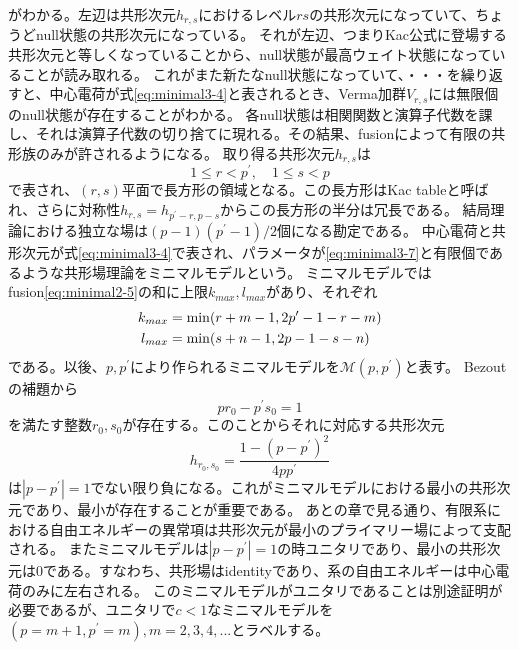 \documentclass[11pt, aps, longbibliography]{article}
\numberwithin{equation}{section}
\begin{document}
        がわかる。左辺は共形次元$h_{r,s}$におけるレベル$rs$の共形次元になっていて、ちょうどnull状態の共形次元になっている。
        それが左辺、つまりKac公式に登場する共形次元と等しくなっていることから、null状態が最高ウェイト状態になっていることが読み取れる。
        これがまた新たなnull状態になっていて、・・・を繰り返すと、中心電荷が式\eqref{eq:minimal3-4}と表されるとき、Verma加群$V_{r,s}$には無限個のnull状態が存在することがわかる。
        各null状態は相関関数と演算子代数を課し、それは演算子代数の切り捨てに現れる。その結果、fusionによって有限の共形族のみが許されるようになる。
        取り得る共形次元$h_{r,s}$は
        \begin{equation}\label{eq:minimal3-7}
            1 \leq r < p^\prime, \quad 1 \leq s < p
        \end{equation}
        で表され、$(r,s)$平面で長方形の領域となる。この長方形はKac tableと呼ばれ、さらに対称性$h_{r,s}=h_{p^\prime-r, p-s}$からこの長方形の半分は冗長である。
        結局理論における独立な場は$(p-1)(p^\prime -1)/2$個になる勘定である。
        中心電荷と共形次元が式\eqref{eq:minimal3-4}で表され、パラメータが\eqref{eq:minimal3-7}と有限個であるような共形場理論をミニマルモデルという。
        ミニマルモデルではfusion\eqref{eq:minimal2-5}の和に上限$k_{max},l_{max}$があり、それぞれ
        \begin{align}\label{eq:minimal3-8}
            k_{max} &= \min (r+m-1,2p^\prime-1-r-m) \\
            l_{max} &= \min (s+n-1, 2p-1-s-n) \notag
        \end{align}
        である。以後、$p,p^\prime$により作られるミニマルモデルを$\mathcal{M}(p,p^\prime)$と表す。
        Bezoutの補題から
        \begin{equation}\label{eq:minimal3-9}
            pr_0-p^\prime s_0=1
        \end{equation}
        を満たす整数$r_0,s_0$が存在する。このことからそれに対応する共形次元
        \begin{equation}\label{eq:minimal3-10}
            h_{r_0,s_0} = \frac{1-(p-p^\prime)^2}{4pp^\prime}
        \end{equation}
        は$|p-p^\prime|=1$でない限り負になる。これがミニマルモデルにおける最小の共形次元であり、最小が存在することが重要である。
        あとの章で見る通り、有限系における自由エネルギーの異常項は共形次元が最小のプライマリー場によって支配される。
        またミニマルモデルは$|p-p^\prime|=1$の時ユニタリであり、最小の共形次元は0である。すなわち、共形場はidentityであり、系の自由エネルギーは中心電荷のみに左右される。
        このミニマルモデルがユニタリであることは別途証明が必要であるが、ユニタリで$c<1$なミニマルモデルを
        $(p=m+1,p^\prime=m), m=2,3,4,...$とラベルする。
\end{document}
